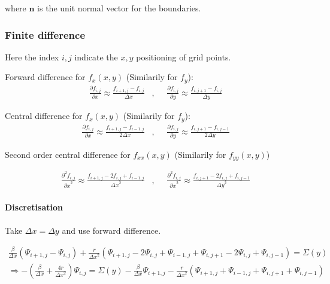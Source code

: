 \documentclass[11pt]{article}
\begin{document}
where \(\mathbf{n}\) is the unit normal vector for the boundaries.

    \hypertarget{finite-difference}{%
\subsubsection{Finite difference}\label{finite-difference}}

Here the index \(i,j\) indicate the \(x,y\) positioning of grid points.

Forward difference for \(f_x(x,y)\) (Similarily for \(f_y\)):
\begin{align*}
\frac{\partial f_{i,j}}{\partial x} \approx \frac{f_{i+1,j} - f_{i,j}}{\Delta x}\,\,\,\,\,,\,\,\,\,\,\,\,\, \frac{\partial f_{i,j}}{\partial y} \approx \frac{f_{i,j+1} - f_{i,j}}{\Delta y}
\end{align*}

Central difference for \(f_x(x,y)\) (Similarily for \(f_y\)):
\begin{align*}
\frac{\partial f_{i,j}}{\partial x} \approx \frac{f_{i+1,j} - f_{i-1,j}}{2\Delta x}\,\,\,\,\,,\,\,\,\,\,\,\,\, \frac{\partial f_{i,j}}{\partial y} \approx \frac{f_{i,j+1} - f_{i,j-1}}{2\Delta y}
\end{align*}

Second order central difference for \(f_{xx}(x,y)\) (Similarily for
\(f_{yy}(x,y)\))

\begin{align*}
\frac{\partial^2 f_{i,j}}{{\partial x}^2} \approx \frac{f_{i+1,j} -2f_{i,j} + f_{i-1,j}}{{\Delta x}^2} \,\,\,\,\,,\,\,\,\,\,\,\,\, \frac{\partial^2 f_{i,j}}{{\partial x}^2} \approx \frac{f_{i,j+1} -2f_{i,j} + f_{i,j-1}}{{\Delta y}^2}
\end{align*}

    \hypertarget{discretisation}{%
\paragraph{Discretisation}\label{discretisation}}

Take \(\Delta x = \Delta y\) and use forward difference.

\begin{align*}
\frac{\beta}{\Delta x} \left(\Psi_{i+1,j} - \Psi_{i,j} \right) + \frac{r}{{\Delta x}^2} \left( \Psi_{i+1,j} - 2\Psi_{i,j} + \Psi_{i-1,j} + \Psi_{i,j+1} - 2\Psi_{i,j} + \Psi_{i,j-1} \right) = \Sigma (y) \\
\Longrightarrow -\left( \frac{\beta}{\Delta x} + \frac{4r}{{\Delta x}^2} \right) \Psi_{i,j} = \Sigma (y) - \frac{\beta}{\Delta x} \Psi_{i+1,j} - \frac{r}{{\Delta x}^2} \left( \Psi_{i+1,j} + \Psi_{i-1,j} + \Psi_{i,j+1} + \Psi_{i,j-1} \right)
\end{align*}
\end{document}

